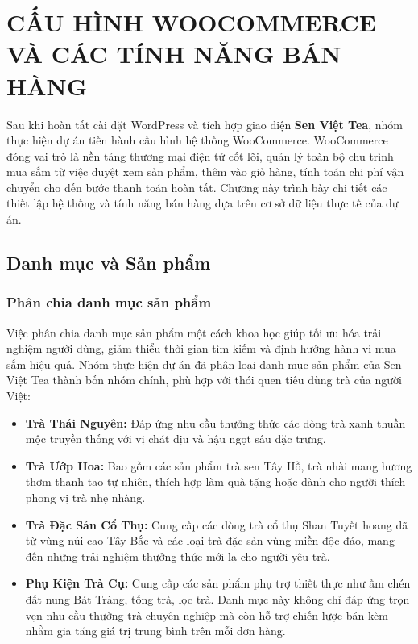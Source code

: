 \chapter{CẤU HÌNH WOOCOMMERCE VÀ CÁC TÍNH NĂNG BÁN HÀNG}

Sau khi hoàn tất cài đặt WordPress và tích hợp giao diện \textbf{Sen Việt Tea}, nhóm thực hiện dự án tiến hành cấu hình hệ thống WooCommerce. WooCommerce đóng vai trò là nền tảng thương mại điện tử cốt lõi, quản lý toàn bộ chu trình mua sắm từ việc duyệt xem sản phẩm, thêm vào giỏ hàng, tính toán chi phí vận chuyển cho đến bước thanh toán hoàn tất. Chương này trình bày chi tiết các thiết lập hệ thống và tính năng bán hàng dựa trên cơ sở dữ liệu thực tế của dự án.

\section{Danh mục và Sản phẩm}

\subsection{Phân chia danh mục sản phẩm}
Việc phân chia danh mục sản phẩm một cách khoa học giúp tối ưu hóa trải nghiệm người dùng, giảm thiểu thời gian tìm kiếm và định hướng hành vi mua sắm hiệu quả. Nhóm thực hiện dự án đã phân loại danh mục sản phẩm của Sen Việt Tea thành bốn nhóm chính, phù hợp với thói quen tiêu dùng trà của người Việt:

\begin{itemize}
    \item \textbf{Trà Thái Nguyên:} Đáp ứng nhu cầu thưởng thức các dòng trà xanh thuần mộc truyền thống với vị chát dịu và hậu ngọt sâu đặc trưng.
    \item \textbf{Trà Ướp Hoa:} Bao gồm các sản phẩm trà sen Tây Hồ, trà nhài mang hương thơm thanh tao tự nhiên, thích hợp làm quà tặng hoặc dành cho người thích phong vị trà nhẹ nhàng.
    \item \textbf{Trà Đặc Sản Cổ Thụ:} Cung cấp các dòng trà cổ thụ Shan Tuyết hoang dã từ vùng núi cao Tây Bắc và các loại trà đặc sản vùng miền độc đáo, mang đến những trải nghiệm thưởng thức mới lạ cho người yêu trà.
    \item \textbf{Phụ Kiện Trà Cụ:} Cung cấp các sản phẩm phụ trợ thiết thực như ấm chén đất nung Bát Tràng, tống trà, lọc trà. Danh mục này không chỉ đáp ứng trọn vẹn nhu cầu thưởng trà chuyên nghiệp mà còn hỗ trợ chiến lược bán kèm nhằm gia tăng giá trị trung bình trên mỗi đơn hàng.
\end{itemize}

